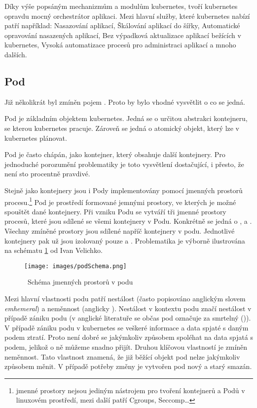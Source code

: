 Díky výše popsáným mechanizmům a modulům kubernetes, tvoří kubernetes opravdu mocný orchestrátor aplikaci. Mezi hlavní služby, které kubernetes nabízí patří například: Nasazování aplikací, Škálování aplikací do šířky, Automatické opravování nasazených aplikací, Bez výpadková aktualizace aplikací bežících v kubernetes, Vysoká automatizace procesů pro administraci aplikací a mnoho dalších.\cite{poulton_2022_the}

\subsection{Pod}

Již několikrát byl zmíněn pojem . Proto by bylo vhodné vysvětlit o co se jedná.

Pod je základním objektem kubernetes. Jedná se o určitou abstrakci kontejneru, se kterou kubernetes pracuje. Zároveň se jedná o atomický objekt, který lze v  kubernetes plánovat. 

Pod je často chápán, jako kontejner, který obsahuje další kontejnery. Pro jednoduché porozumění problematiky je toto vysvětlení dostačující, i přesto, že není sto procentně pravdivé.

Stejně jako kontejnery jsou i Pody implementovány pomocí jmenných prostorů procesu.\footnote{jmenné prostory nejsou jediným nástrojem pro tvoření kontejnerů a Podů v linuxovém prostředí, mezi další patří Cgroups, Seccomp\ldots} Pod je prostředí formované jemnými prostory, ve kterých je možné spouštět dané kontejnery. Při vzniku Podu se vytváří tři jmenné prostory procesů, které jsou sdílené se všemi kontejnery v Podu. Konkrétně se jedná o ,  a . Všechny zmíněné prostory jsou sdílené napříč kontejnery v podu. Jednotlivé kontejnery pak už jsou izolovaný pouze 
a . Problematika je výborně ilustrována na schématu \ref{img:podSchema} od Ivan Velichko.
\begin{figure}[ht]
\centering
\texttt{[image: images/podSchema.png]}
\caption{~Schéma jmenných prostorů v podu}\label{img:podSchema}
\end{figure}

Mezi hlavní vlastnosti podu patří nestálost (často popisováno anglickým slovem \textit{emhemeral}) a neměnnost (anglicky ). Nestálost v kontextu podu značí nestálost v případě zániku podu (v anglické literatuře se občas pod označuje za smrtelný ()). V případě zániku podu v kubernetes se veškeré informace a data spjaté s daným podem ztratí. Proto není dobré se jakýmkoliv způsobem spoléhat na data spjatá s podem, jelikož o ně můžeme snadno přijít. Druhou klíčovou vlastností je zmíněn neměnnost. Tato vlastnost znamená, že již běžící objekt pod nelze jakýmkoliv způsobem měnit. V případě potřeby změny je vytvořen pod nový a starý smazán.\cite{poulton_2022_the}

